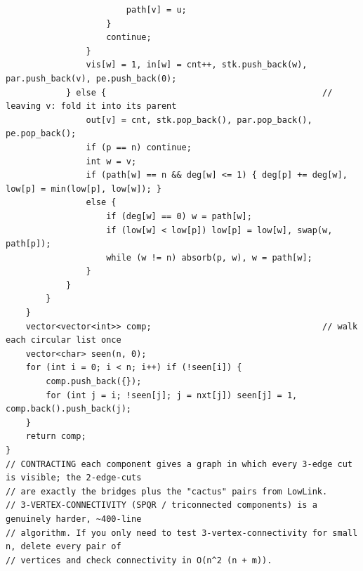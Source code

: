 \documentclass[9pt,a4paper,twocolumn]{extarticle}
\begin{document}
\begin{lstlisting}
                        path[v] = u;
                    }
                    continue;
                }
                vis[w] = 1, in[w] = cnt++, stk.push_back(w), par.push_back(v), pe.push_back(0);
            } else {                                           // leaving v: fold it into its parent
                out[v] = cnt, stk.pop_back(), par.pop_back(), pe.pop_back();
                if (p == n) continue;
                int w = v;
                if (path[w] == n && deg[w] <= 1) { deg[p] += deg[w], low[p] = min(low[p], low[w]); }
                else {
                    if (deg[w] == 0) w = path[w];
                    if (low[w] < low[p]) low[p] = low[w], swap(w, path[p]);
                    while (w != n) absorb(p, w), w = path[w];
                }
            }
        }
    }
    vector<vector<int>> comp;                                  // walk each circular list once
    vector<char> seen(n, 0);
    for (int i = 0; i < n; i++) if (!seen[i]) {
        comp.push_back({});
        for (int j = i; !seen[j]; j = nxt[j]) seen[j] = 1, comp.back().push_back(j);
    }
    return comp;
}
// CONTRACTING each component gives a graph in which every 3-edge cut is visible; the 2-edge-cuts
// are exactly the bridges plus the "cactus" pairs from LowLink.
// 3-VERTEX-CONNECTIVITY (SPQR / triconnected components) is a genuinely harder, ~400-line
// algorithm. If you only need to test 3-vertex-connectivity for small n, delete every pair of
// vertices and check connectivity in O(n^2 (n + m)).
\end{lstlisting}

\filbreak
\end{document}
